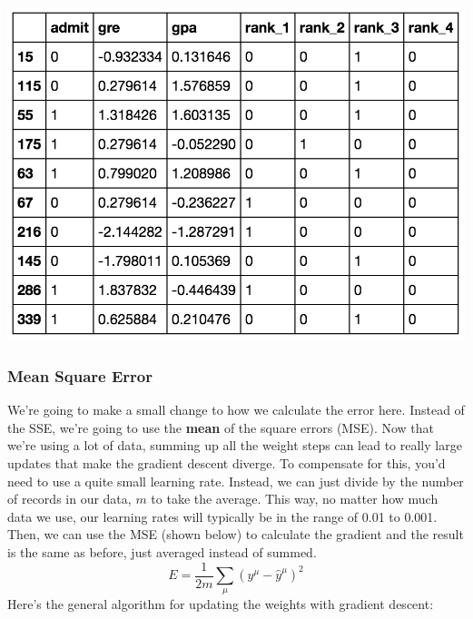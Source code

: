 \includegraphics[width=1\linewidth]{img//intro/example-data.png}


\subsubsection{Mean Square Error}

We're going to make a small change to how we calculate the error here. Instead of the SSE, we're going to use the \textbf{mean} of the square errors (MSE). Now that we're using a lot of data, summing up all the weight steps can lead to really large updates that make the gradient descent diverge. To compensate for this, you'd need to use a quite small learning rate. Instead, we can just divide by the number of records in our data, \(m\) to take the average. This way, no matter how much data we use, our learning rates will typically be in the range of 0.01 to 0.001. Then, we can use the MSE (shown below) to calculate the gradient and the result is the same as before, just averaged instead of summed.
\[E=\frac{1}{2m}\sum_{\mu}(y^{\mu}-\hat{y}^{\mu})^2\]
Here's the general algorithm for updating the weights with gradient descent:

